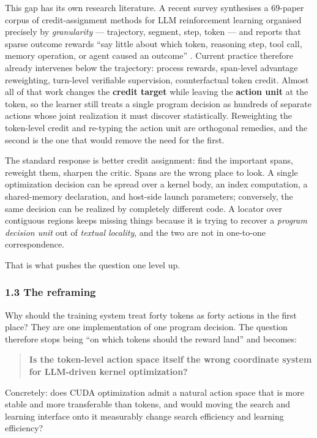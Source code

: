 \documentclass[
  11pt,
]{article}
\begin{document}
This gap has its own research literature. A recent survey synthesises a 69-paper corpus of credit-assignment methods for LLM reinforcement learning organised precisely by \emph{granularity} --- trajectory, segment, step, token --- and reports that sparse outcome rewards ``say little about which token, reasoning step, tool call, memory operation, or agent caused an outcome'' \cite{from35}. Current practice therefore already intervenes below the trajectory: process rewards, span-level advantage reweighting, turn-level verifiable supervision, counterfactual token credit. Almost all of that work changes the \textbf{credit target} while leaving the \textbf{action unit} at the token, so the learner still treats a single program decision as hundreds of separate actions whose joint realization it must discover statistically. Reweighting the token-level credit and re-typing the action unit are orthogonal remedies, and the second is the one that would remove the need for the first.

The standard response is better credit assignment: find the important spans, reweight them, sharpen the critic. Spans are the wrong place to look. A single optimization decision can be spread over a kernel body, an index computation, a shared-memory declaration, and host-side launch parameters; conversely, the same decision can be realized by completely different code. A locator over contiguous regions keeps missing things because it is trying to recover a \emph{program decision unit} out of \emph{textual locality}, and the two are not in one-to-one correspondence.

That is what pushes the question one level up.

\hypertarget{the-reframing}{%
\subsubsection{1.3 The reframing}\label{the-reframing}}

Why should the training system treat forty tokens as forty actions in the first place? They are one implementation of one program decision. The question therefore stops being ``on which tokens should the reward land'' and becomes:

\begin{quote}
\textbf{Is the token-level action space itself the wrong coordinate system for LLM-driven kernel optimization?}
\end{quote}

Concretely: does CUDA optimization admit a natural action space that is more stable and more transferable than tokens, and would moving the search and learning interface onto it measurably change search efficiency and learning efficiency?
\end{document}
